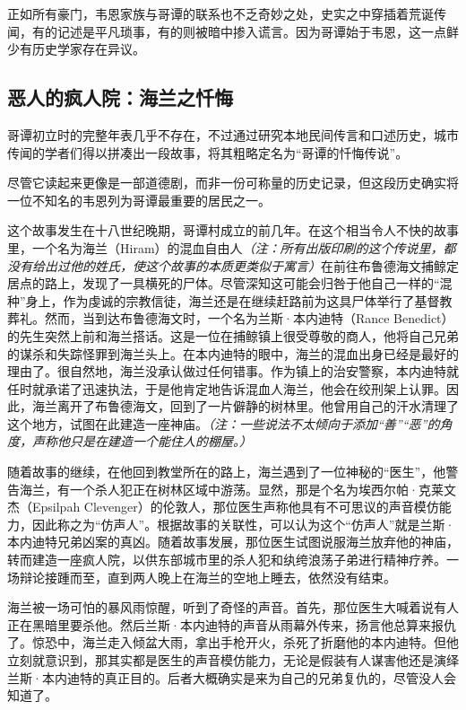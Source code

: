 \documentclass[9pt,openany]{extbook}
\newcommand{\splitdot}{\shusong ·}
\begin{document}
\begin{multicols}{2}
    正如所有豪门，韦恩家族与哥谭的联系也不乏奇妙之处，史实之中穿插着荒诞传闻，有的记述是平凡琐事，有的则被暗中掺入谎言。因为哥谭始于韦恩，这一点鲜少有历史学家存在异议。

    \subsection{恶人的疯人院：海兰之忏悔}

    哥谭初立时的完整年表几乎不存在，不过通过研究本地民间传言和口述历史，城市传闻的学者们得以拼凑出一段故事，将其粗略定名为“哥谭的忏悔传说”。

    尽管它读起来更像是一部道德剧，而非一份可称量的历史记录，但这段历史确实将一位不知名的韦恩列为哥谭最重要的居民之一。

    这个故事发生在十八世纪晚期，哥谭村成立的前几年。在这个相当令人不快的故事里，一个名为海兰（Hiram）的混血自由人\textit{（注：所有出版印刷的这个传说里，都没有给出过他的姓氏，使这个故事的本质更类似于寓言）}在前往布鲁德海文捕鲸定居点的路上，发现了一具横死的尸体。尽管深知这可能会归咎于他自己一样的“混种”身上，作为虔诚的宗教信徒，海兰还是在继续赶路前为这具尸体举行了基督教葬礼。然而，当到达布鲁德海文时，一个名为兰斯{\splitdot}本内迪特（Rance Benedict）的先生突然上前和海兰搭话。这是一位在捕鲸镇上很受尊敬的商人，他将自己兄弟的谋杀和失踪怪罪到海兰头上。在本内迪特的眼中，海兰的混血出身已经是最好的理由了。很自然地，海兰没承认做过任何错事。作为镇上的治安警察，本内迪特就任时就承诺了迅速执法，于是他肯定地告诉混血人海兰，他会在绞刑架上认罪。因此，海兰离开了布鲁德海文，回到了一片僻静的树林里。他曾用自己的汗水清理了这个地方，试图在此建造一座神庙。\textit{（注：一些说法不太倾向于添加“善”“恶”的角度，声称他只是在建造一个能住人的棚屋。）}

    随着故事的继续，在他回到教堂所在的路上，海兰遇到了一位神秘的“医生”，他警告海兰，有一个杀人犯正在树林区域中游荡。显然，那是个名为埃西尔帕{\splitdot}克莱文杰（Epsilpah Clevenger）的伦敦人，那位医生声称他具有不可思议的声音模仿能力，因此称之为“仿声人”。根据故事的关联性，可以认为这个“仿声人”就是兰斯{\splitdot}本内迪特兄弟凶案的真凶。随着故事发展，那位医生试图说服海兰放弃他的神庙，转而建造一座疯人院，以供东部城市里的杀人犯和纨绔浪荡子弟进行精神疗养。一场辩论接踵而至，直到两人晚上在海兰的空地上睡去，依然没有结束。

    海兰被一场可怕的暴风雨惊醒，听到了奇怪的声音。首先，那位医生大喊着说有人正在黑暗里要杀他。然后兰斯{\splitdot}本内迪特的声音从雨幕外传来，扬言他总算来报仇了。惊恐中，海兰走入倾盆大雨，拿出手枪开火，杀死了折磨他的本内迪特。但他立刻就意识到，那其实都是医生的声音模仿能力，无论是假装有人谋害他还是演绎兰斯{\splitdot}本内迪特的真正目的。后者大概确实是来为自己的兄弟复仇的，尽管没人会知道了。


\end{multicols}
\end{document}

